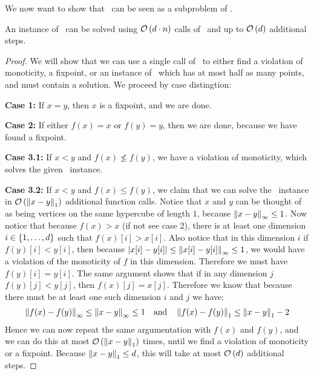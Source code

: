 We now want to show that \Tarskistar\ can be seen as a subproblem of \Tarski.
\begin{claim}
    An instance of \Tarski\ can be solved using $\mathcal{O}\left(d\cdot n\right)$ calls of \Tarskistar\ and up to $\mathcal{O}\left(d\right)$ additional steps.
\end{claim}
\begin{proof}
    We will show that we can use a single call of \Tarskistar\ to either find a violation of monoticity, a fixpoint, or an instance of \Tarski\ which has at most half as many points, and must contain a solution. We proceed by case distingtion:

    \textbf{Case 1:} If $x=y$, then $x$ is a fixpoint, and we are done.

    \textbf{Case 2:} If either $f(x) = x$ or $f(y) = y$, then we are done, because we have found a fixpoint.

    \textbf{Case 3.1:} If $x < y$ and $f(x) \not\leq f(y)$, we have a violation of monoticity, which solves the given \Tarski\ instance.

    \textbf{Case 3.2:} If $x < y$ and $f(x) \leq f(y)$, we claim that we can solve the \Tarski\ instance in $\mathcal{O}\left(\left\lVert x - y\right\rVert_{1}\right)$ additional function calls. Notice that $x$ and $y$ can be thought of as being vertices on the same hypercube of length $1$, because $\left\lVert x-y\right\rVert_{\infty} \leq 1$. Now notice that because $f(x) > x$ (if not see case 2), there is at least one dimension $i \in \left\{1, \dots, d\right\}$ such that $f(x)[i] > x[i]$. Also notice that in this dimension $i$ if $f(y)[i] < y[i]$, then because $\left\lvert x[i] - y[i]\right\rvert \leq \left\lVert x[i] - y[i]\right\rVert_{\infty} \leq 1$, we would have a violation of the monoticity of $f$ in this dimension. Therefore we must have $f(y)[i] = y[i]$. The same argument shows that if in any dimension $j$ $f(y)[j] < y[j]$, then $f(x)[j] = x[j]$. Therefore we know that because there must be at least one such dimension $i$ and $j$ we have:
    \begin{align*}
        \left\lVert f(x) - f(y)\right\rVert_{\infty} \leq \left\lVert x - y\right\rVert_{\infty} \leq 1 \quad \text{and} \quad \left\lVert f(x) - f(y)\right\rVert_{1} \leq \left\lVert x - y\right\rVert_{1} - 2
    \end{align*}
    Hence we can now repeat the same argumentation with $f(x)$ and $f(y)$, and we can do this at most $\mathcal{O}\left(\left\lVert x - y\right\rVert_{1}\right)$ times, until we find a violation of monoticity or a fixpoint. Because $\left\lVert x - y\right\rVert_{1} \leq d$, this will take at most $\mathcal{O}\left(d\right)$ additional steps.


\end{proof}
